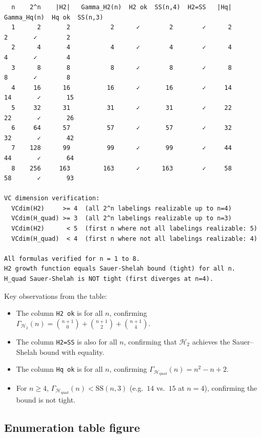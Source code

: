 \documentclass{article}
\begin{document}
\begin{notebox}
\small
\begin{verbatim}
  n    2^n    |H2|   Gamma_H2(n)  H2 ok  SS(n,4)  H2=SS   |Hq|   Gamma_Hq(n)  Hq ok  SS(n,3)
  1      2       2           2      ✓        2        ✓      2           2       ✓        2
  2      4       4           4      ✓        4        ✓      4           4       ✓        4
  3      8       8           8      ✓        8        ✓      8           8       ✓        8
  4     16      16          16      ✓       16        ✓     14          14       ✓       15
  5     32      31          31      ✓       31        ✓     22          22       ✓       26
  6     64      57          57      ✓       57        ✓     32          32       ✓       42
  7    128      99          99      ✓       99        ✓     44          44       ✓       64
  8    256     163         163      ✓      163        ✓     58          58       ✓       93
 
VC dimension verification:
  VCdim(H2)     >= 4  (all 2^n labelings realizable up to n=4)
  VCdim(H_quad) >= 3  (all 2^n labelings realizable up to n=3)
  VCdim(H2)      < 5  (first n where not all labelings realizable: 5)
  VCdim(H_quad)  < 4  (first n where not all labelings realizable: 4)
 
All formulas verified for n = 1 to 8.
H2 growth function equals Sauer-Shelah bound (tight) for all n.
H_quad Sauer-Shelah is NOT tight (first diverges at n=4).
\end{verbatim}
\end{notebox}
 
Key observations from the table:
\begin{itemize}
  \item The column \texttt{H2 ok} is \checkmark{} for all $n$, confirming
    $\Gamma_{\mathcal{H}_2}(n)=\binom{n+1}{0}+\binom{n+1}{2}+\binom{n+1}{4}$.
  \item The column \texttt{H2=SS} is also \checkmark{} for all $n$, confirming
    that $\mathcal{H}_2$ achieves the Sauer--Shelah bound with equality.
  \item The column \texttt{Hq ok} is \checkmark{} for all $n$, confirming
    $\Gamma_{\mathcal{H}_{\mathrm{quad}}}(n)=n^2-n+2$.
  \item For $n\ge4$, $\Gamma_{\mathcal{H}_{\mathrm{quad}}}(n)<\text{SS}(n,3)$
    (e.g.\ $14$ vs.\ $15$ at $n=4$), confirming the bound is not tight.
\end{itemize}
 
\subsection{Enumeration table figure}
 
\end{document}
